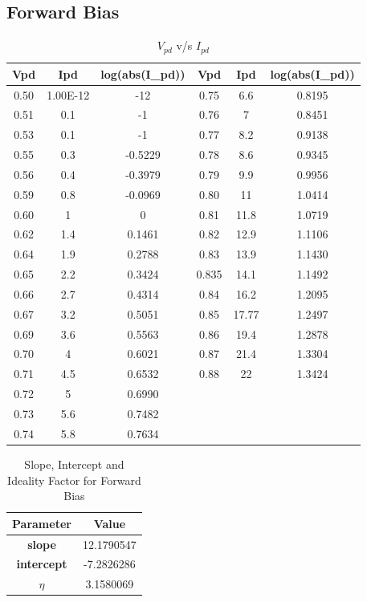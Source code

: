 \documentclass[a4paper]{article}
\begin{document}
\subsection{Forward Bias}
\begin{table}[h!]
\centering
\begin{tabular}{|c|c|c|c|c|c|}
\hline
\textbf{Vpd} & \textbf{Ipd} & \textbf{log(abs(I\_pd))} & \textbf{Vpd} & \textbf{Ipd} & \textbf{log(abs(I\_pd))} \\ \hline
0.50 & 1.00E-12 & -12 & 0.75 & 6.6  & 0.8195 \\ \hline
0.51 & 0.1      & -1  & 0.76 & 7    & 0.8451 \\ \hline
0.53 & 0.1      & -1  & 0.77 & 8.2  & 0.9138 \\ \hline
0.55 & 0.3      & -0.5229 & 0.78 & 8.6  & 0.9345 \\ \hline
0.56 & 0.4      & -0.3979 & 0.79 & 9.9  & 0.9956 \\ \hline
0.59 & 0.8      & -0.0969 & 0.80 & 11   & 1.0414 \\ \hline
0.60 & 1        & 0      & 0.81 & 11.8 & 1.0719 \\ \hline
0.62 & 1.4      & 0.1461 & 0.82 & 12.9 & 1.1106 \\ \hline
0.64 & 1.9      & 0.2788 & 0.83 & 13.9 & 1.1430 \\ \hline
0.65 & 2.2      & 0.3424 & 0.835 & 14.1 & 1.1492 \\ \hline
0.66 & 2.7      & 0.4314 & 0.84 & 16.2 & 1.2095 \\ \hline
0.67 & 3.2      & 0.5051 & 0.85 & 17.77 & 1.2497 \\ \hline
0.69 & 3.6      & 0.5563 & 0.86 & 19.4 & 1.2878 \\ \hline
0.70 & 4        & 0.6021 & 0.87 & 21.4 & 1.3304 \\ \hline
0.71 & 4.5      & 0.6532 & 0.88 & 22   & 1.3424 \\ \hline
0.72 & 5        & 0.6990 &       &      &        \\ \hline
0.73 & 5.6      & 0.7482 &       &      &        \\ \hline
0.74 & 5.8      & 0.7634 &       &      &        \\ \hline
\end{tabular}
\caption{$V_{pd}$ v/s $I_{pd}$}
\end{table}

\begin{table}[h!]
\centering
\begin{tabular}{|c|c|}
\hline
\textbf{Parameter} & \textbf{Value} \\ \hline
\textbf{slope}     & 12.1790547     \\ \hline
\textbf{intercept} & -7.2826286     \\ \hline
\textbf{$\eta$}       & 3.1580069      \\ \hline
\end{tabular}
\caption{Slope, Intercept and Ideality Factor for Forward Bias}
\label{tab:params}
\end{table}
\end{document}
